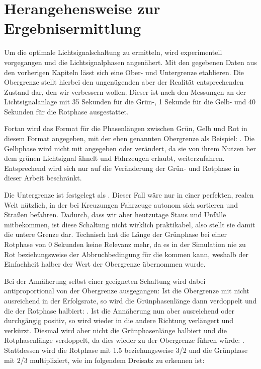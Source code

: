 %


\section{Herangehensweise zur Ergebnisermittlung}\label{sec:approach}

Um die optimale Lichtsignalschaltung zu ermitteln, wird experimentell vorgegangen und die Lichtsignalphasen angenähert.
Mit den gegebenen Daten aus den vorherigen Kapiteln lässt sich eine Ober- und Untergrenze etablieren.
Die Obergrenze stellt hierbei den ungenügenden aber der Realität entsprechenden Zustand dar, den wir verbessern wollen.
Dieser ist nach den Messungen an der Lichtsignalanlage mit 35 Sekunden für die Grün-, 1 Sekunde für die Gelb- und 40 Sekunden für die Rotphase ausgestattet.

Fortan wird das Format für die Phasenlängen zwischen Grün, Gelb und Rot in diesem Format angegeben, mit der eben genannten Obergrenze als Beispiel: .
Die Gelbphase wird nicht mit angegeben oder verändert, da sie von ihrem Nutzen her dem grünen Lichtsignal ähnelt und Fahrzeugen erlaubt, weiterzufahren.
Entsprechend wird sich nur auf die Veränderung der Grün- und Rotphase in dieser Arbeit beschränkt.

Die Untergrenze ist festgelegt als .
Dieser Fall wäre nur in einer perfekten, realen Welt nützlich, in der bei Kreuzungen Fahrzeuge autonom sich sortieren und Straßen befahren.
Dadurch, dass wir aber heutzutage Staus und Unfälle mitbekommen, ist diese Schaltung nicht wirklich praktikabel, also stellt sie damit die untere Grenze dar.
Technisch hat die Länge der Grünphase bei einer Rotphase von 0 Sekunden keine Relevanz mehr, da es in der Simulation nie zu Rot beziehungsweise der Abbruchbedingung für die  kommen kann, weshalb der Einfachheit halber der Wert der Obergrenze übernommen wurde.


Bei der Annäherung selbst einer geeigneten Schaltung wird dabei antiproportional von der Obergrenze ausgegangen:
Ist die Obergrenze mit  nicht ausreichend in der Erfolgsrate, so wird die Grünphasenlänge dann verdoppelt und die der Rotphase halbiert: .
Ist die Annäherung nun aber ausreichend oder durchgängig positiv, so wird wieder in die andere Richtung verlängert und verkürzt.
Diesmal wird aber nicht die Grünphasenlänge halbiert und die Rotphasenlänge verdoppelt, da dies wieder zu der Obergrenze führen würde:  .
Stattdessen wird die Rotphase mit 1.5 beziehungsweise 3/2 und die Grünphase mit 2/3 multipliziert, wie im folgendem Dreisatz zu erkennen ist:

